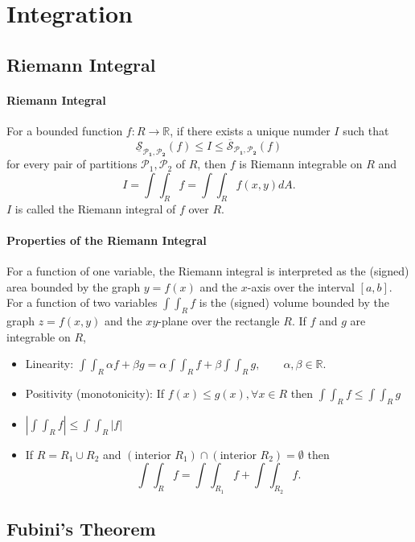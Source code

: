 
\section{Integration}

\subsection{Riemann Integral}
\paragraph{Riemann Integral}
For a bounded function \(f: R \to \mathbb R\), if there exists a unique numder \(I\) such that 
\[
    \underline{\mathcal S}_{\mathcal P_{\textbf{1}}, \mathcal P_{\textbf{2}}}(f) \leq
    I \leq
    \overline{\mathcal S}_{\mathcal P_{\textbf{1}}, \mathcal P_{\textbf{2}}}(f)
\]
for every pair of partitions \(\mathcal{P}_1, \mathcal{P}_2\) of \(R\), then \(f\) is Riemann integrable on \(R\) and
\[I = \int\int_R f = \int\int_R f(x, y) dA.\]
\(I\) is called the Riemann integral of \(f\) over \(R\).

\paragraph{Properties of the Riemann Integral}
For a function of one variable, the Riemann integral is interpreted as the (signed) area bounded by the graph \(y = f(x)\) and the \(x\)-axis over the interval \([a,b]\). For a function of two variables \(\int\int_R f\) is the (signed) volume bounded by the graph \(z=f(x,y)\) and the \(xy\)-plane over the rectangle \(R\).
If \(f\) and \(g\) are integrable on \(R\),
\begin{itemize}
    \item Linearity: \(\int\int_R \alpha f + \beta g = \alpha \int\int_R f + \beta \int \int_R g, \qquad \alpha, \beta \in \mathbb R\).
    \item Positivity (monotonicity): If \(f(x)\leq g(x), \forall x\in R\) then \(\int\int_R f \leq \int\int_R g\)
    \item \(\left| \int\int_R f \right| \leq \int\int_R \left| f \right | \)
    \item If \(R = R_1 \cup R_2\) and \((\text{interior }R_1) \cap (\text{interior }R_2) = \emptyset\) then
    \[\int\int_R f = \int\int_{R_1} f + \int\int_{R_2} f.\]
\end{itemize}

\subsection{Fubini's Theorem}
